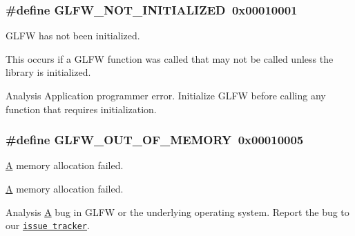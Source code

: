 \subsubsection[{G\+L\+F\+W\+\_\+\+N\+O\+T\+\_\+\+I\+N\+I\+T\+I\+A\+L\+I\+Z\+E\+D}]{\setlength{\rightskip}{0pt plus 5cm}\#define G\+L\+F\+W\+\_\+\+N\+O\+T\+\_\+\+I\+N\+I\+T\+I\+A\+L\+I\+Z\+E\+D~0x00010001}\label{group__errors_ga2374ee02c177f12e1fa76ff3ed15e14a}


G\+L\+F\+W has not been initialized. 

This occurs if a G\+L\+F\+W function was called that may not be called unless the library is initialized.

\begin{DoxyParagraph}{Analysis}
Application programmer error. Initialize G\+L\+F\+W before calling any function that requires initialization. 
\end{DoxyParagraph}
\hypertarget{group__errors_ga9023953a2bcb98c2906afd071d21ee7f}{}
\subsubsection[{G\+L\+F\+W\+\_\+\+O\+U\+T\+\_\+\+O\+F\+\_\+\+M\+E\+M\+O\+R\+Y}]{\setlength{\rightskip}{0pt plus 5cm}\#define G\+L\+F\+W\+\_\+\+O\+U\+T\+\_\+\+O\+F\+\_\+\+M\+E\+M\+O\+R\+Y~0x00010005}\label{group__errors_ga9023953a2bcb98c2906afd071d21ee7f}


\hyperlink{structA}{A} memory allocation failed. 

\hyperlink{structA}{A} memory allocation failed.

\begin{DoxyParagraph}{Analysis}
\hyperlink{structA}{A} bug in G\+L\+F\+W or the underlying operating system. Report the bug to our \href{https://github.com/glfw/glfw/issues}{\tt issue tracker}. 
\end{DoxyParagraph}
\hypertarget{group__errors_gad44162d78100ea5e87cdd38426b8c7a1}{}
